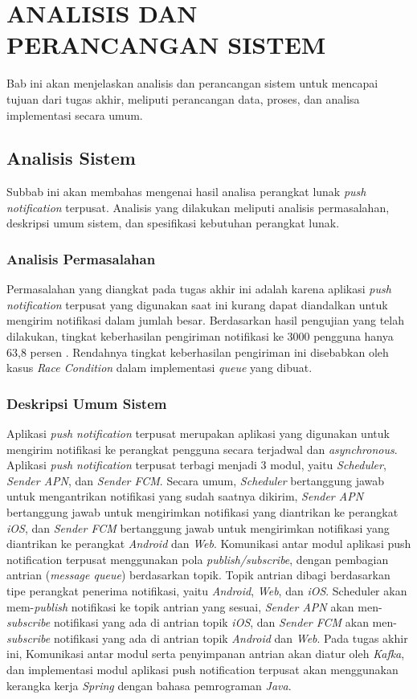 \chapter{ANALISIS DAN PERANCANGAN SISTEM}
Bab ini akan menjelaskan analisis dan perancangan sistem untuk mencapai tujuan dari tugas akhir, meliputi perancangan data, proses, dan analisa implementasi secara umum.

\section{Analisis Sistem}
Subbab ini akan membahas mengenai hasil analisa perangkat lunak \textit{push notification} terpusat. Analisis yang dilakukan meliputi analisis permasalahan, deskripsi umum sistem, dan spesifikasi kebutuhan perangkat lunak.

    \subsection{Analisis Permasalahan}
    Permasalahan yang diangkat pada tugas akhir ini adalah karena aplikasi \textit{push notification} terpusat yang digunakan saat ini kurang dapat diandalkan untuk mengirim notifikasi dalam jumlah besar. Berdasarkan hasil pengujian yang telah dilakukan, tingkat keberhasilan pengiriman notifikasi ke 3000 pengguna hanya 63,8 persen \cite{application-thesis}. Rendahnya tingkat keberhasilan pengiriman ini disebabkan oleh kasus \textit{Race Condition} dalam implementasi \textit{queue} yang dibuat.

    \subsection{Deskripsi Umum Sistem}
    Aplikasi \textit{push notification} terpusat merupakan aplikasi yang digunakan untuk mengirim notifikasi ke perangkat pengguna secara terjadwal dan \textit{asynchronous}.
    Aplikasi \textit{push notification} terpusat terbagi menjadi 3 modul, yaitu \textit{Scheduler}, \textit{Sender APN}, dan \textit{Sender FCM}. Secara umum, \textit{Scheduler} bertanggung jawab untuk mengantrikan notifikasi yang sudah saatnya dikirim, \textit{Sender APN} bertanggung jawab untuk mengirimkan notifikasi yang diantrikan ke perangkat \textit{iOS}, dan \textit{Sender FCM} bertanggung jawab untuk mengirimkan notifikasi yang diantrikan ke perangkat \textit{Android} dan \textit{Web}.
    Komunikasi antar modul aplikasi push notification terpusat menggunakan pola \textit{publish/subscribe}, dengan pembagian antrian (\textit{message queue}) berdasarkan topik. Topik antrian dibagi berdasarkan tipe perangkat penerima notifikasi, yaitu \textit{Android}, \textit{Web}, dan \textit{iOS}. Scheduler akan mem-\textit{publish} notifikasi ke topik antrian yang sesuai, \textit{Sender APN} akan men-\textit{subscribe} notifikasi yang ada di antrian topik \textit{iOS}, dan \textit{Sender FCM} akan men-\textit{subscribe} notifikasi yang ada di antrian topik \textit{Android} dan \textit{Web}.
    Pada tugas akhir ini, Komunikasi antar modul serta penyimpanan antrian akan diatur oleh \textit{Kafka}, dan implementasi modul aplikasi push notification terpusat akan menggunakan kerangka kerja \textit{Spring} dengan bahasa pemrograman \textit{Java}.

